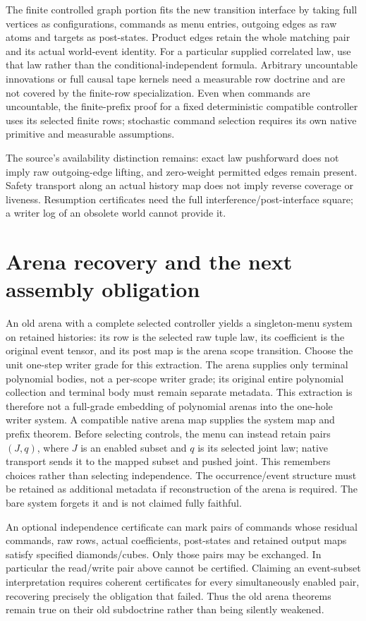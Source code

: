 \documentclass[11pt]{article}
\begin{document}
The finite controlled graph portion fits the new transition interface by taking full vertices as configurations, commands as menu entries, outgoing edges as raw atoms and targets as post-states. Product edges retain the whole matching pair and its actual world-event identity. For a particular supplied correlated law, use that law rather than the conditional-independent formula. Arbitrary uncountable innovations or full causal tape kernels need a measurable row doctrine and are not covered by the finite-row specialization. Even when commands are uncountable, the finite-prefix proof for a fixed deterministic compatible controller uses its selected finite rows; stochastic command selection requires its own native primitive and measurable assumptions.

The source's availability distinction remains: exact law pushforward does not imply raw outgoing-edge lifting, and zero-weight permitted edges remain present. Safety transport along an actual history map does not imply reverse coverage or liveness. Resumption certificates need the full interference/post-interface square; a writer log of an obsolete world cannot provide it.

\section{Arena recovery and the next assembly obligation}
An old arena with a complete selected controller yields a singleton-menu system on retained histories: its row is the selected raw tuple law, its coefficient is the original event tensor, and its post map is the arena scope transition. Choose the unit one-step writer grade for this extraction. The arena supplies only terminal polynomial bodies, not a per-scope writer grade; its original entire polynomial collection and terminal body must remain separate metadata. This extraction is therefore not a full-grade embedding of polynomial arenas into the one-hole writer system. A compatible native arena map supplies the system map and prefix theorem. Before selecting controls, the menu can instead retain pairs $(J,q)$, where $J$ is an enabled subset and $q$ is its selected joint law; native transport sends it to the mapped subset and pushed joint. This remembers choices rather than selecting independence. The occurrence/event structure must be retained as additional metadata if reconstruction of the arena is required. The bare system forgets it and is not claimed fully faithful.

An optional independence certificate can mark pairs of commands whose residual commands, raw rows, actual coefficients, post-states and retained output maps satisfy specified diamonds/cubes. Only those pairs may be exchanged. In particular the read/write pair above cannot be certified. Claiming an event-subset interpretation requires coherent certificates for every simultaneously enabled pair, recovering precisely the obligation that failed. Thus the old arena theorems remain true on their old subdoctrine rather than being silently weakened.
\end{document}
